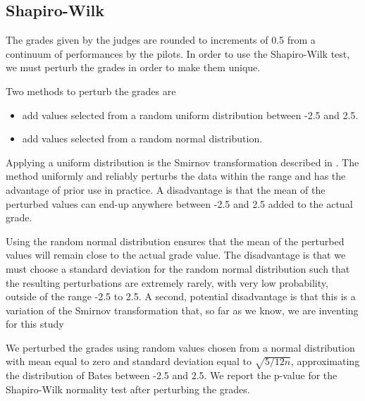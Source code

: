 \subsection{Shapiro-Wilk}

The grades given by the judges are rounded to increments
of 0.5 from a continuum of performances by the pilots.
In order to use the Shapiro-Wilk test, we
must perturb the grades in order to make them unique.

Two methods to perturb the grades are
\begin{itemize}
\item add values selected from a random uniform distribution between -2.5 and
2.5.
\item add values selected from a random normal distribution.
\end{itemize}

Applying a uniform distribution is the Smirnov transformation described
in \cite{lemkol}.
The method uniformly and
reliably perturbs the data within the range and has the advantage of
prior use in practice. A disadvantage is that the mean
of the perturbed values can end-up anywhere between -2.5 and 2.5 added to
the actual grade.

Using the random normal distribution ensures that the mean of the perturbed
values will remain close to the actual grade value. The disadvantage is that
we must choose a standard deviation for the random normal distribution
such that the resulting perturbations are
extremely rarely, with very low probability, outside of the range -2.5 to
2.5.  A second, potential disadvantage is that this is a variation of the
Smirnov transformation that, so far as we know,
we are inventing for this study

We perturbed the grades using random values chosen from a normal distribution
with mean equal to zero and standard deviation equal to $\sqrt{5/12n}$,
approximating the distribution of Bates \cite{Bates} between -2.5 and 2.5.
We report the p-value for the Shapiro-Wilk normality test after perturbing
the grades.
